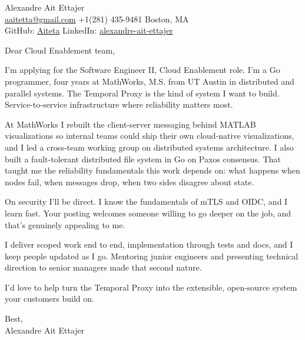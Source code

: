 \documentclass{article}
\begin{document}
\begin{flushleft}
    {\Large Alexandre Ait Ettajer} \\
    \href{mailto:aaitetta@gmail.com}{aaitetta@gmail.com} \quad +1(281) 435-9481 \quad Boston, MA \\
    GitHub: \href{https://github.com/aiteta}{Aiteta} \quad LinkedIn: \href{https://www.linkedin.com/in/alexandre-ait-ettajer-65740b170/}{alexandre-ait-ettajer} \\
\end{flushleft}

\vspace{1em}

Dear Cloud Enablement team,

I'm applying for the Software Engineer II, Cloud Enablement role. I'm a Go programmer, four years at MathWorks, M.S. from UT Austin in distributed and parallel systems. The Temporal Proxy is the kind of system I want to build. Service-to-service infrastructure where reliability matters most.

At MathWorks I rebuilt the client-server messaging behind MATLAB visualizations so internal teams could ship their own cloud-native visualizations, and I led a cross-team working group on distributed systems architecture. I also built a fault-tolerant distributed file system in Go on Paxos consensus. That taught me the reliability fundamentals this work depends on: what happens when nodes fail, when messages drop, when two sides disagree about state.

On security I'll be direct. I know the fundamentals of mTLS and OIDC, and I learn fast. Your posting welcomes someone willing to go deeper on the job, and that's genuinely appealing to me.

I deliver scoped work end to end, implementation through tests and docs, and I keep people updated as I go. Mentoring junior engineers and presenting technical direction to senior managers made that second nature.

I'd love to help turn the Temporal Proxy into the extensible, open-source system your customers build on.

Best, \\
Alexandre Ait Ettajer
\end{document}
